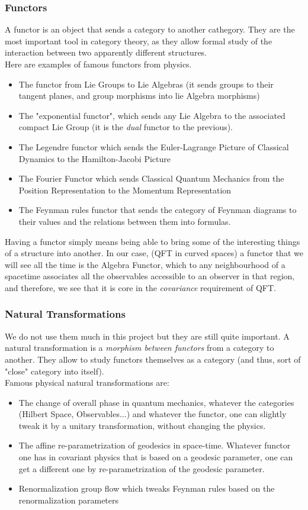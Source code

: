\documentclass[a4paper,11pt]{article}
\numberwithin{equation}{section}
\theoremstyle{definition}
\begin{document}
    \subsubsection{Functors}
    A functor is an object that sends a category to another cathegory. They are the most important tool in category theory, as they allow formal study of the interaction between two apparently different structures.\\
    Here are examples of famous functors from physics.
    \begin{itemize}
        \item The functor from Lie Groups to Lie Algebras (it sends groups to their tangent planes, and group morphisms into lie Algebra morphisms)
        \item  The "exponential functor", which sends any Lie Algebra to the associated compact Lie Group (it is the \emph{dual} functor to the previous).
        \item The Legendre functor which sends the Euler-Lagrange Picture of Classical Dynamics to the Hamilton-Jacobi Picture
        \item The Fourier Functor which sends Classical Quantum Mechanics from the Position Representation to the Momentum Representation
        \item The Feynman rules functor that sends the category of Feynman diagrams to their values and the relations between them into formulas.
    \end{itemize}
    Having a functor simply means being able to bring some of the interesting things of a structure into another. In our case, (QFT in curved spaces) a functor that we will see all the time is the Algebra Functor, which to any neighbourhood of a spacetime associates all the observables accessible to an observer in that region, and therefore, we see that it is core in the \emph{covariance} requirement of QFT.

    \subsubsection{Natural Transformations}
    We do not use them much in this project but they are still quite important. A natural transformation is a \emph{morphism between functors} from a category to another. They allow to study functors themselves as a category (and thus, sort of "close" category into itself).\\
    Famous physical natural transformations are:
    \begin{itemize}
        \item The change of overall phase in quantum mechanics, whatever the categories (Hilbert Space, Observables...) and whatever the functor, one can slightly tweak it by a unitary transformation, without changing the physics.
        \item The affine re-parametrization of geodesics in space-time. Whatever functor one has in covariant physics that is based on a geodesic parameter, one can get a different one by re-parametrization of the geodesic parameter.
        \item Renormalization group flow which tweaks Feynman rules based on the renormalization parameters
    \end{itemize}
\end{document}

